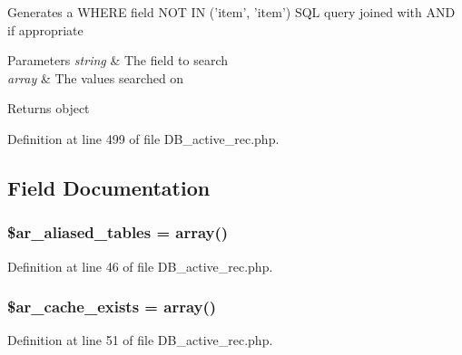 Generates a W\-H\-E\-R\-E field N\-O\-T I\-N ('item', 'item') S\-Q\-L query joined with A\-N\-D if appropriate


\begin{DoxyParams}{Parameters}
{\em string} & The field to search \\
\hline
{\em array} & The values searched on \\
\hline
\end{DoxyParams}
\begin{DoxyReturn}{Returns}
object 
\end{DoxyReturn}


Definition at line 499 of file D\-B\-\_\-active\-\_\-rec.\-php.



\subsection{Field Documentation}
\hypertarget{class_c_i___d_b__active__record_afc57b21431b4cdf800edd0a18c802e18}{
\subsubsection[{\$ar\-\_\-aliased\-\_\-tables}]{\setlength{\rightskip}{0pt plus 5cm}\$ar\-\_\-aliased\-\_\-tables = array()}}\label{class_c_i___d_b__active__record_afc57b21431b4cdf800edd0a18c802e18}


Definition at line 46 of file D\-B\-\_\-active\-\_\-rec.\-php.

\hypertarget{class_c_i___d_b__active__record_a18e3446f3dcc9905e3747ef2e7f7b7eb}{
\subsubsection[{\$ar\-\_\-cache\-\_\-exists}]{\setlength{\rightskip}{0pt plus 5cm}\$ar\-\_\-cache\-\_\-exists = array()}}\label{class_c_i___d_b__active__record_a18e3446f3dcc9905e3747ef2e7f7b7eb}


Definition at line 51 of file D\-B\-\_\-active\-\_\-rec.\-php.

